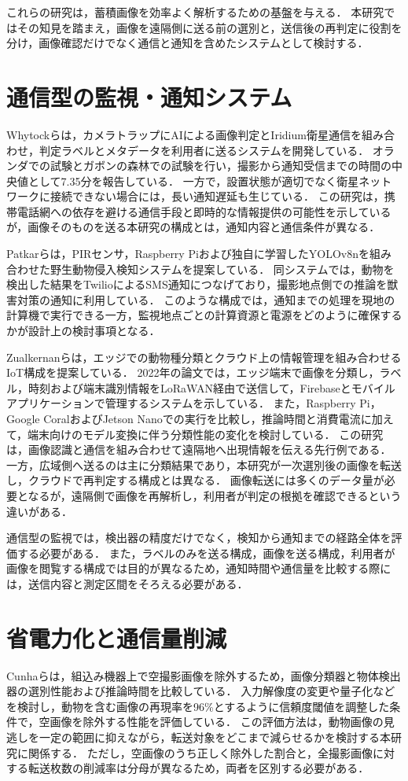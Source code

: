 これらの研究は，蓄積画像を効率よく解析するための基盤を与える．
本研究ではその知見を踏まえ，画像を遠隔側に送る前の選別と，送信後の再判定に役割を分け，画像確認だけでなく通信と通知を含めたシステムとして検討する．

\section{通信型の監視・通知システム}
Whytockら\cite{Whytock2023}は，カメラトラップにAIによる画像判定とIridium衛星通信を組み合わせ，判定ラベルとメタデータを利用者に送るシステムを開発している．
オランダでの試験とガボンの森林での試験を行い，撮影から通知受信までの時間の中央値として7.35分を報告している．
一方で，設置状態が適切でなく衛星ネットワークに接続できない場合には，長い通知遅延も生じている．
この研究は，携帯電話網への依存を避ける通信手段と即時的な情報提供の可能性を示しているが，画像そのものを送る本研究の構成とは，通知内容と通信条件が異なる．

Patkarら\cite{Patkar2025}は，PIRセンサ，Raspberry Piおよび独自に学習したYOLOv8nを組み合わせた野生動物侵入検知システムを提案している．
同システムでは，動物を検出した結果をTwilioによるSMS通知につなげており，撮影地点側での推論を獣害対策の通知に利用している．
このような構成では，通知までの処理を現地の計算機で実行できる一方，監視地点ごとの計算資源と電源をどのように確保するかが設計上の検討事項となる．

Zualkernanらは，エッジでの動物種分類とクラウド上の情報管理を組み合わせるIoT構成を提案している\cite{Zualkernan2020}．
2022年の論文\cite{Zualkernan2022}では，エッジ端末で画像を分類し，ラベル，時刻および端末識別情報をLoRaWAN経由で送信して，Firebaseとモバイルアプリケーションで管理するシステムを示している．
また，Raspberry Pi，Google CoralおよびJetson Nanoでの実行を比較し，推論時間と消費電流に加えて，端末向けのモデル変換に伴う分類性能の変化を検討している．
この研究は，画像認識と通信を組み合わせて遠隔地へ出現情報を伝える先行例である．
一方，広域側へ送るのは主に分類結果であり，本研究が一次選別後の画像を転送し，クラウドで再判定する構成とは異なる．
画像転送には多くのデータ量が必要となるが，遠隔側で画像を再解析し，利用者が判定の根拠を確認できるという違いがある．

通信型の監視では，検出器の精度だけでなく，検知から通知までの経路全体を評価する必要がある．
また，ラベルのみを送る構成，画像を送る構成，利用者が画像を閲覧する構成では目的が異なるため，通知時間や通信量を比較する際には，送信内容と測定区間をそろえる必要がある．

\section{省電力化と通信量削減}
Cunhaら\cite{Cunha2021}は，組込み機器上で空撮影画像を除外するため，画像分類器と物体検出器の選別性能および推論時間を比較している．
入力解像度の変更や量子化などを検討し，動物を含む画像の再現率を96\%とするように信頼度閾値を調整した条件で，空画像を除外する性能を評価している．
この評価方法は，動物画像の見逃しを一定の範囲に抑えながら，転送対象をどこまで減らせるかを検討する本研究に関係する．
ただし，空画像のうち正しく除外した割合と，全撮影画像に対する転送枚数の削減率は分母が異なるため，両者を区別する必要がある．

